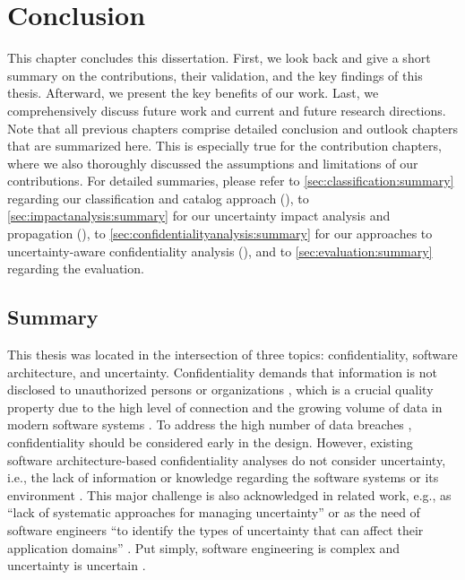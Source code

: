 \chapter{Conclusion}%
\label{ch:conclusion}%
 

This chapter concludes this dissertation.
First, we look back and give a short summary on the contributions, their validation, and the key findings of this thesis.
Afterward, we present the key benefits of our work.
Last, we comprehensively discuss future work and current and future research directions.
Note that all previous chapters comprise detailed conclusion and outlook chapters that are summarized here.
This is especially true for the contribution chapters, where we also thoroughly discussed the assumptions and limitations of our contributions.
For detailed summaries, please refer to \autoref{sec:classification:summary} regarding our classification and catalog approach (), to \autoref{sec:impactanalysis:summary} for our uncertainty impact analysis and propagation (), to \autoref{sec:confidentialityanalysis:summary} for our approaches to uncertainty-aware confidentiality analysis (), and to \autoref{sec:evaluation:summary} regarding the evaluation.





\section{Summary}%
\label{sec:conclusion:summary}

This thesis was located in the intersection of three topics: confidentiality, software architecture, and uncertainty.
Confidentiality demands that information is not disclosed to unauthorized persons or organizations \cite{international_organization_for_standardization_isoiec_2018}, which is a crucial quality property due to the high level of connection and the growing volume of data in modern software systems \cite{olivero_security_2019}.
To address the high number of data breaches \cite{cheng_enterprise_2017,gatzlaff_effect_2010,ayyagari_exploratory_2012}, confidentiality should be considered early in the design.
However, existing software architecture-based confidentiality analyses \cite{seifermann_architectural_2022,walter_context-based_2023,pilipchuk_architectural_2021,peldszus_secure_2019,boltz_extensible_2024} do not consider uncertainty, i.e., the lack of information or knowledge regarding the software systems or its environment \cite{international_organization_for_standardization_isoiec_2018,perez-palacin_uncertainties_2014,acosta_uncertainty_2022}.
This major challenge is also acknowledged in related work, e.g., as \enquote{lack of systematic approaches for managing uncertainty} \cite{hezavehi_uncertainty_2021} or as the need of software engineers \enquote{to identify the types of uncertainty that can affect their application domains} \cite{troya_uncertainty_2021}.
Put simply, software engineering is complex \cite{weyns_introduction_2020} and uncertainty is uncertain \cite{garlan_unknown_2021}.

